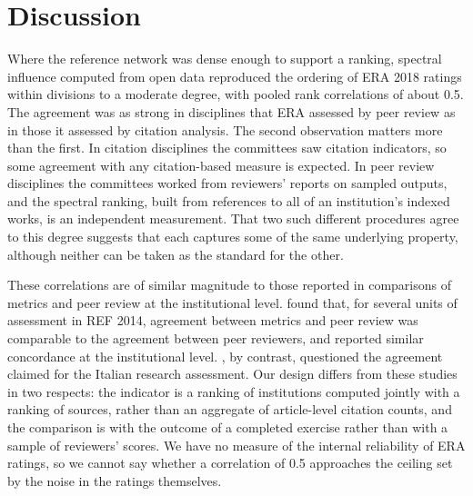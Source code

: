 \section{Discussion}
\label{sec:discussion}

Where the reference network was dense enough to support a ranking, spectral influence computed from open data reproduced the ordering of ERA 2018 ratings within divisions to a moderate degree, with pooled rank correlations of about 0.5. The agreement was as strong in disciplines that ERA assessed by peer review as in those it assessed by citation analysis. The second observation matters more than the first. In citation disciplines the committees saw citation indicators, so some agreement with any citation-based measure is expected. In peer review disciplines the committees worked from reviewers' reports on sampled outputs, and the spectral ranking, built from references to all of an institution's indexed works, is an independent measurement. That two such different procedures agree to this degree suggests that each captures some of the same underlying property, although neither can be taken as the standard for the other.

These correlations are of similar magnitude to those reported in comparisons of metrics and peer review at the institutional level. \citet{traagSystematicAnalysisAgreement2019} found that, for several units of assessment in REF 2014, agreement between metrics and peer review was comparable to the agreement between peer reviewers, and \citet{pridePeerReviewCitation2018} reported similar concordance at the institutional level. \citet{bacciniTheyAgreeBibliometric2016}, by contrast, questioned the agreement claimed for the Italian research assessment. Our design differs from these studies in two respects: the indicator is a ranking of institutions computed jointly with a ranking of sources, rather than an aggregate of article-level citation counts, and the comparison is with the outcome of a completed exercise rather than with a sample of reviewers' scores. We have no measure of the internal reliability of ERA ratings, so we cannot say whether a correlation of 0.5 approaches the ceiling set by the noise in the ratings themselves.

